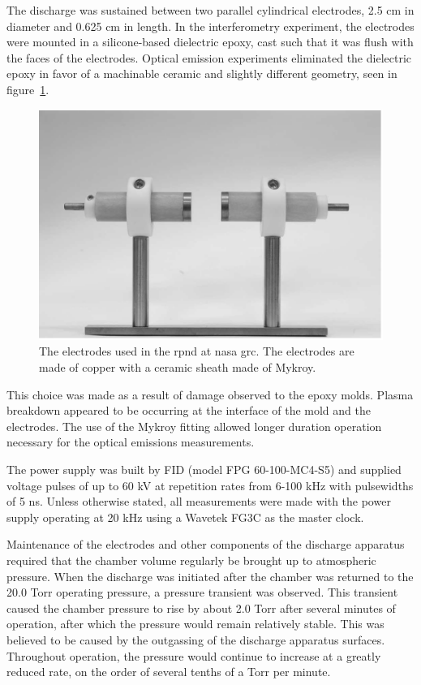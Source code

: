 The discharge was sustained between two parallel cylindrical electrodes, 2.5 cm
in diameter and 0.625 cm in length. In the interferometry experiment, the
electrodes were mounted in a silicone-based dielectric epoxy, cast such that it
was flush with the faces of the electrodes. Optical emission experiments
eliminated the dielectric epoxy in favor of a machinable ceramic and slightly
different geometry, seen in figure~\ref{fig:electrodes}.
\begin{figure}
  \centering
  \includegraphics{./chapters/nasa/figures/electrodes.pdf}
  \caption{The electrodes used in the \acs{rpnd} at \acs{nasa} \acs{grc}. The
    electrodes are made of copper with a ceramic sheath made of Mykroy.}
  \label{fig:electrodes}
\end{figure}
This choice was made as a result of damage observed to the epoxy molds. Plasma
breakdown appeared to be occurring at the interface of the mold and the
electrodes. The use of the Mykroy fitting allowed longer duration operation
necessary for the optical emissions measurements.

The power supply was built by FID (model FPG 60-100-MC4-S5) and supplied voltage
pulses of up to 60 kV at repetition rates from 6-100 kHz with pulsewidths of 5
ns. Unless otherwise stated, all measurements were made with the power supply
operating at 20 kHz using a Wavetek FG3C as the master clock.

Maintenance of the electrodes and other components of the discharge apparatus
required that the chamber volume regularly be brought up to atmospheric
pressure. When the discharge was initiated after the chamber was returned to the
20.0 Torr operating pressure, a pressure transient was observed. This transient
caused the chamber pressure to rise by about 2.0 Torr after several minutes of
operation, after which the pressure would remain relatively stable. This was
believed to be caused by the outgassing of the discharge apparatus surfaces.
Throughout operation, the pressure would continue to increase at a greatly
reduced rate, on the order of several tenths of a Torr per minute.

